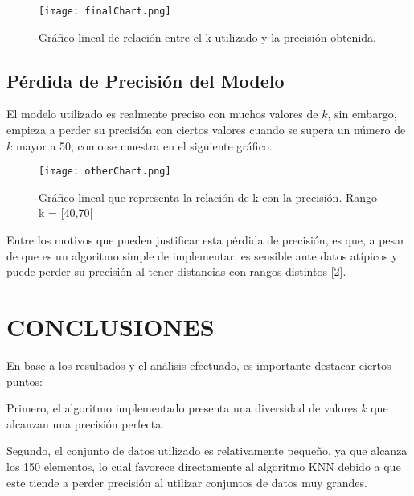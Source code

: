 \documentclass{article_saj}
\begin{document}
\begin{figure}[H]
\centerline{\texttt{[image: finalChart.png]}}
\caption{Gráfico lineal de relación entre el k utilizado y la precisión obtenida.}
\label{fig9}
\end{figure}
\subsection{Pérdida de Precisión del Modelo}

\indent

El modelo utilizado es realmente preciso con muchos valores de \begin{math}
    k
\end{math}, sin embargo, empieza a perder su precisión con ciertos valores cuando se supera un número de \begin{math}
    k
\end{math} mayor a 50, como se muestra en el siguiente gráfico. 

\begin{figure}[H]
\centerline{\texttt{[image: otherChart.png]}}
\caption{Gráfico lineal que representa la relación de k con la precisión. Rango k = [40,70[}
\label{fig10}
\end{figure}

Entre los motivos que pueden justificar esta pérdida de precisión, es que, a pesar de que es un algoritmo simple de implementar, es sensible ante datos atípicos y puede perder su precisión al tener distancias con rangos distintos [2].

\section{CONCLUSIONES}

\indent

En base a los resultados y el análisis efectuado, es importante destacar ciertos puntos:

\indent

Primero, el algoritmo implementado presenta una diversidad de valores \begin{math}
    k
\end{math} que alcanzan una precisión perfecta.

\indent

Segundo, el conjunto de datos utilizado es relativamente pequeño, ya que alcanza los 150 elementos, lo cual favorece directamente al algoritmo KNN debido a que este tiende a perder precisión al utilizar conjuntos de datos muy grandes. 
\end{document}
